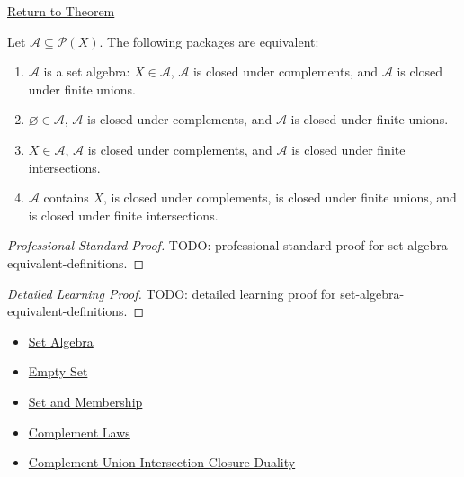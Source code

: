 \newpage
{}
\label{prf:set-algebra-equivalent-definitions}

\begin{remark*}[Return]
\hyperref[thm:set-algebra-equivalent-definitions]{Return to Theorem}
\end{remark*}

\begin{theorem*}
Let \(\mathcal A\subseteq\mathcal P(X)\).  The following packages are
equivalent:
\begin{enumerate}[label=(\roman*)]
\item \(\mathcal A\) is a set algebra: \(X\in\mathcal A\), \(\mathcal A\) is
      closed under complements, and \(\mathcal A\) is closed under finite
      unions.
\item \(\varnothing\in\mathcal A\), \(\mathcal A\) is closed under
      complements, and \(\mathcal A\) is closed under finite unions.
\item \(X\in\mathcal A\), \(\mathcal A\) is closed under complements, and
      \(\mathcal A\) is closed under finite intersections.
\item \(\mathcal A\) contains \(X\), is closed under complements, is closed
      under finite unions, and is closed under finite intersections.
\end{enumerate}
\end{theorem*}

\begin{proof}[Professional Standard Proof]
\LRAProofBodyStart
TODO: professional standard proof for set-algebra-equivalent-definitions.
\end{proof}

\begin{proof}[Detailed Learning Proof]
\LRAProofBodyStart
TODO: detailed learning proof for set-algebra-equivalent-definitions.
\end{proof}

\begin{remark*}
\end{remark*}

\begin{dependencies}
\begin{itemize}
  \item \hyperref[def:set-algebra]{Set Algebra}
  \item \hyperref[def:empty-set]{Empty Set}
  \item \hyperref[def:set-membership]{Set and Membership}
  \item \hyperref[thm:complement-laws]{Complement Laws}
  \item \hyperref[thm:complement-union-intersection-closure-duality]{Complement-Union-Intersection Closure Duality}
\end{itemize}
\end{dependencies}

\clearpage
